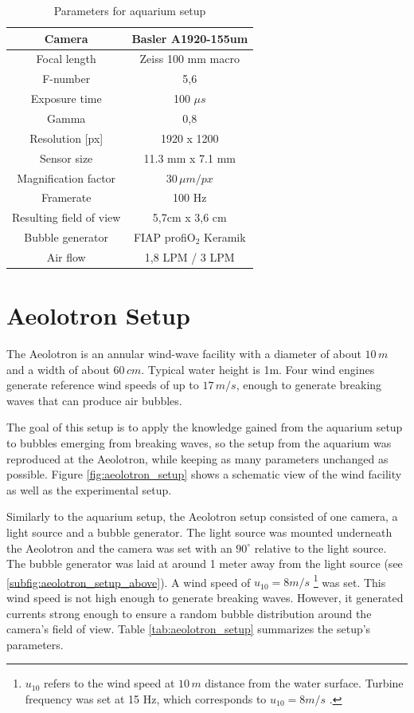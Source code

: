 		\begin{table}[h]
			\centering
		
			\begin{tabular}{|c|c|}
			\hline 
			Camera & Basler A1920-155um \\ 
			\hline 
			Focal length & Zeiss 100 mm macro \\ 
			\hline 
			F-number & 5,6 \\ 
			\hline 
			Exposure time & 100 $\mu s$ \\ 
			\hline 
			Gamma & 0,8 \\
			\hline
			Resolution [px] &1920 x 1200 \\
			\hline 
			Sensor size & 11.3 mm x 7.1 mm \\
			\hline 
			Magnification factor & $30 \, \mu m/px$ \\ 
			\hline 
			Framerate & 100 Hz \\ 
			\hline 
			Resulting field of view & 5,7cm x 3,6 cm \\
			\hline
			Bubble generator & FIAP profiO$_2$ Keramik\\			
			\hline
			Air flow & 1,8 LPM / 3 LPM \\ 
			\hline
			\end{tabular} 
			
			\caption{Parameters for aquarium setup}
			\label{tab:aquarium_param}

		\end{table}
		
	\section{Aeolotron Setup}\label{aeolotron_setup}
		The Aeolotron is an annular wind-wave facility with a diameter of about $10 \, m$ and a width of about $60 \, cm$. Typical water height is 1m. Four wind engines generate reference wind speeds of up to $17 \, m/s$, enough to generate breaking waves that can produce air bubbles. 
		
		The goal of this setup is to apply the knowledge gained from the aquarium setup to bubbles emerging from breaking waves, so the setup from the aquarium was reproduced at the Aeolotron, while keeping as many parameters unchanged as possible. Figure \ref{fig:aeolotron_setup} shows a schematic view of the wind facility as well as the experimental setup. 
		
		Similarly to the aquarium setup, the Aeolotron setup consisted of one camera, a light source and a bubble generator. 
		The light source was mounted underneath the Aeolotron and the camera was set with an $90^\circ$ relative to the light source. The bubble generator was laid at around 1 meter away from the light source (see \ref{subfig:aeolotron_setup_above}). A wind speed of $u_{10} = 8 m/s$ \footnote{$u_{10}$ refers to the wind speed at $10 \, m$ distance from the water surface. Turbine frequency was set at 15 Hz, which corresponds to $u_{10} = 8 m/s$ \citep{Bopp2018}.} was set. This wind speed is not high enough to generate breaking waves. However, it generated currents strong enough to ensure a random bubble distribution around the camera's field of view. Table \ref{tab:aeolotron_setup} summarizes the setup's parameters.
	

